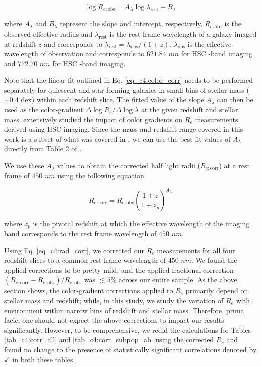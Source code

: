 \begin{equation}
    \log R_{e;\mathrm{obs}} = A_{\lambda} \log \lambda_{\mathrm{rest}} + B_{\lambda}
    \label{eq_c4:color_corr}
\end{equation}

\noindent where $A_{\lambda}$ and $B_{\lambda}$ represent the slope and intercept, respectively. $R_{e;\mathrm{obs}}$ is the observed effective radius and $\lambda_{\mathrm{rest}}$ is the rest-frame wavelength of a galaxy imaged at redshift $z$ and corresponds to $\lambda_{\mathrm{rest}} = \lambda_{\mathrm{obs}}/(1+z)$. $\lambda_{\mathrm{obs}}$ is the effective wavelength of observation and corresponds to $621.84\,\,nm$ for HSC \rb-band imaging and $772.70\,\,nm$ for HSC \ib-band imaging. 

Note that the linear fit outlined in Eq. \ref{eq_c4:color_corr} needs to be performed separately for quiescent and star-forming galaxies in small bins of stellar mass ($\sim 0.4$ dex) within each redshift slice. The fitted value of the slope $A_{\lambda}$ can then be used as the color-gradient $\Delta \log R_e/\Delta \log \lambda$ at the given redshift and stellar mass. \citet{hsc_mass_size} extensively studied the impact of color gradients on $R_e$ measurements derived using HSC imaging. Since the mass and redshift range covered in this work is a subset of what was covered in \citet{hsc_mass_size}, we can use the best-fit values of $A_{\lambda}$ directly from Table 2 of \citet{hsc_mass_size}. 

We use these $A_{\lambda}$ values to obtain the corrected half light radii ($R_{e;\mathrm{corr}}$) at a rest frame of $450\,\,nm$ using the following equation

\begin{equation}
    R_{e;\mathrm{corr}} = R_{e;\mathrm{obs}}\left( \frac{1 + z}{1+z_p} \right)^{A_{\lambda}}
    \label{eq_c4:rad_corr}
\end{equation}

\noindent where $z_p$ is the pivotal redshift at which the effective wavelength of the imaging band corresponds to the rest frame wavelength of $450\,\,nm$.

Using Eq. \ref{eq_c4:rad_corr}, we corrected our $R_e$ measurements for all four redshift slices to a common rest frame wavelength of $450\,\,nm$. We found the applied corrections to be pretty mild, and the applied fractional correction $(R_{e;\mathrm{corr}} - R_{e;\mathrm{obs}})/R_{e;\mathrm{obs}}$ was $\lesssim5\%$ across our entire sample. As the above section shows, the color-gradient corrections applied to $R_e$ primarily depend on stellar mass and redshift; while, in this study, we study the variation of $R_e$ with environment within narrow bins of redshift and stellar mass. Therefore, prima facie, one should not expect the above corrections to impact our results significantly. However, to be comprehensive, we redid the calculations for Tables \ref{tab_c4:corr_all} and \ref{tab_c4:corr_subpop_ab} using the corrected $R_e$ and found no change to the presence of statistically significant correlations denoted by $\checkmark$ in both these tables.


